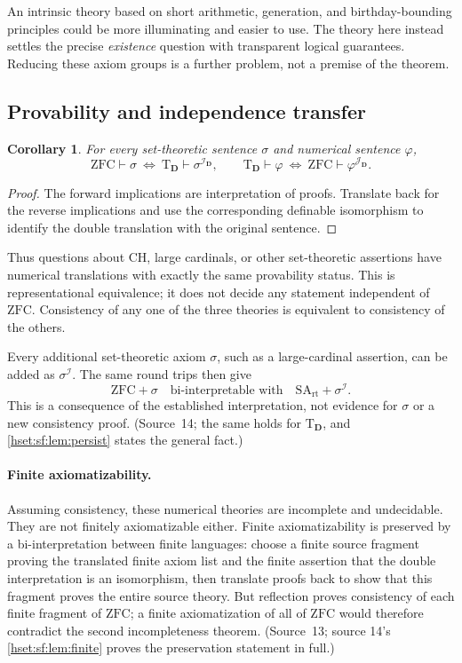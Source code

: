 \documentclass[11pt,letterpaper]{article}
\newtheorem{corollary}[corollary]{Corollary}\aliascntresetthe{corollary}
\theoremstyle{definition}
\theoremstyle{remark}
\newcommand{\I}{\mathcal I}
\newcommand{\J}{\mathcal J}
\newcommand{\ZFC}{\mathrm{ZFC}}
\newcommand{\Dd}{\mathbf{D}}
\newcommand{\Tth}{\mathrm{T}}
\newcommand{\SArt}{\mathrm{SA}_{\mathrm{rt}}}
\begin{document}
An intrinsic theory based on short arithmetic, generation, and birthday-bounding
principles could be more illuminating and easier to use. The theory here instead
settles the precise \emph{existence} question with transparent logical
guarantees. Reducing these axiom groups is a further problem, not a premise of the
theorem.

\subsection{Provability and independence transfer}

\begin{corollary}\label{hset:sf:cor:provability}
For every set-theoretic sentence $\sigma$ and numerical sentence $\varphi$,
\[
 \ZFC\vdash\sigma\ \Longleftrightarrow\ \Tth_{\Dd}\vdash\sigma^{\I_{\Dd}},
 \qquad
 \Tth_{\Dd}\vdash\varphi\ \Longleftrightarrow\ \ZFC\vdash\varphi^{\J_{\Dd}}.
\]
\end{corollary}
\begin{proof}
The forward implications are interpretation of proofs. Translate back for the
reverse implications and use the corresponding definable isomorphism to identify
the double translation with the original sentence.
\end{proof}

Thus questions about CH, large cardinals, or other set-theoretic assertions have
numerical translations with exactly the same provability status. This is
representational equivalence; it does not decide any statement independent of
$\ZFC$. Consistency of any one of the three theories is equivalent to consistency
of the others.

Every additional set-theoretic axiom $\sigma$, such as a large-cardinal assertion,
can be added as $\sigma^\I$. The same round trips then give
\[
 \ZFC+\sigma\quad\text{bi-interpretable with}\quad\SArt+\sigma^\I.
\]
This is a consequence of the established interpretation, not evidence for $\sigma$
or a new consistency proof. (Source~14; the same holds for $\Tth_{\Dd}$, and
\cref{hset:sf:lem:persist} states the general fact.)

\paragraph{Finite axiomatizability.} Assuming consistency, these numerical
theories are incomplete and undecidable. They are not finitely axiomatizable
either. Finite axiomatizability is preserved by a bi-interpretation between finite
languages: choose a finite source fragment proving the translated finite axiom
list and the finite assertion that the double interpretation is an isomorphism,
then translate proofs back to show that this fragment proves the entire source
theory. But reflection proves consistency of each finite fragment of $\ZFC$; a
finite axiomatization of all of $\ZFC$ would therefore contradict the second
incompleteness theorem. (Source~13; source 14's \cref{hset:sf:lem:finite} proves
the preservation statement in full.)
\end{document}

